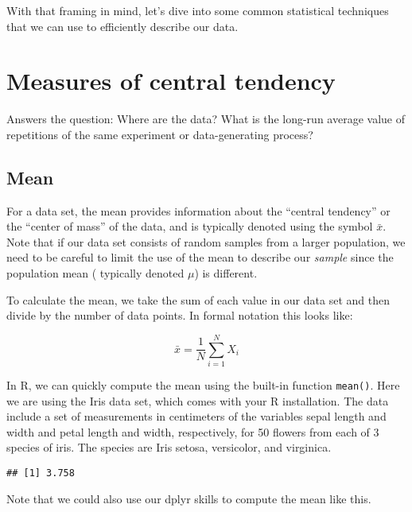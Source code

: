 \documentclass[]{book}
\newenvironment{Shaded}{\begin{snugshade}}{\end{snugshade}}
\newcommand{\KeywordTok}[1]{\textcolor[rgb]{0.13,0.29,0.53}{\textbf{{#1}}}}
\newcommand{\StringTok}[1]{\textcolor[rgb]{0.31,0.60,0.02}{{#1}}}
\newcommand{\NormalTok}[1]{{#1}}
\begin{document}
With that framing in mind, let's dive into some common statistical
techniques that we can use to efficiently describe our data.

\section{Measures of central
tendency}\label{measures-of-central-tendency}

Answers the question: Where are the data? What is the long-run average
value of repetitions of the same experiment or data-generating process?

\subsection{Mean}\label{mean}

For a data set, the mean provides information about the ``central
tendency'' or the ``center of mass'' of the data, and is typically
denoted using the symbol \(\bar{x}\). Note that if our data set consists
of random samples from a larger population, we need to be careful to
limit the use of the mean to describe our \emph{sample} since the
population mean ( typically denoted \(\mu\)) is different.

To calculate the mean, we take the sum of each value in our data set and
then divide by the number of data points. In formal notation this looks
like:

\[ \bar{x} = \frac{1}{N} \sum_{i=1}^{N} X_i \]

In R, we can quickly compute the mean using the built-in function
\texttt{mean()}. Here we are using the Iris data set, which comes with
your R installation. The data include a set of measurements in
centimeters of the variables sepal length and width and petal length and
width, respectively, for 50 flowers from each of 3 species of iris. The
species are Iris setosa, versicolor, and virginica.

\begin{Shaded}
\end{Shaded}

\begin{verbatim}
## [1] 3.758
\end{verbatim}

Note that we could also use our dplyr skills to compute the mean like
this.
\end{document}
